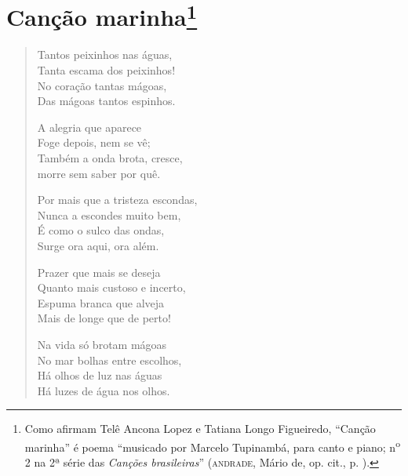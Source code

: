 \chapter{Canção marinha\footnote[*]{Como afirmam Telê Ancona Lopez e
  Tatiana Longo Figueiredo, ``Canção marinha'' é poema ``musicado por
  Marcelo Tupinambá, para canto e piano; n\textsuperscript{o} 2 na 2ª
  série das \emph{Canções brasileiras}'' (\textsc{andrade}, Mário de, op. cit.,
  p. ).}}

\begin{verse}
Tantos peixinhos nas águas,\\
Tanta escama dos peixinhos!\\
No coração tantas mágoas,\\
Das mágoas tantos espinhos.

A alegria que aparece\\
Foge depois, nem se vê;\\
Também a onda brota, cresce,\\
morre sem saber por quê.

Por mais que a tristeza escondas,\\
Nunca a escondes muito bem,\\
É como o sulco das ondas,\\
Surge ora aqui, ora além.

Prazer que mais se deseja\\
Quanto mais custoso e incerto,\\
Espuma branca que alveja\\
Mais de longe que de perto!

Na vida só brotam mágoas\\
No mar bolhas entre escolhos,\\
Há olhos de luz nas águas\\
Há luzes de água nos olhos.
\end{verse}


